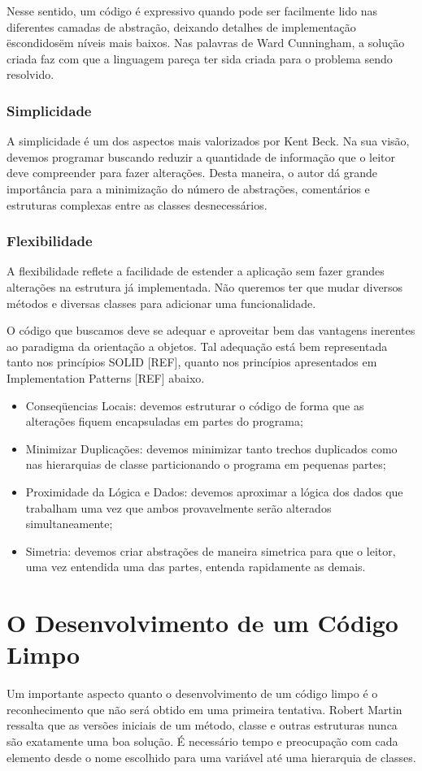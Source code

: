 Nesse sentido, um código é expressivo quando pode ser facilmente lido nas diferentes camadas de abstração, deixando detalhes de implementação \"escondidos\" em níveis mais baixos. Nas palavras de Ward Cunningham, a solução criada faz com que a linguagem pareça ter sida criada para o problema sendo resolvido.

\subsubsection{Simplicidade}
A simplicidade é um dos aspectos mais valorizados por Kent Beck. Na sua visão, devemos programar buscando reduzir a quantidade de informação que o leitor deve compreender para fazer alterações. Desta maneira, o autor dá grande importância para a minimização do número de abstrações, comentários e estruturas complexas entre as classes desnecessários.

\subsubsection{Flexibilidade}
A flexibilidade reflete a facilidade de estender a aplicação sem fazer grandes alterações na estrutura já implementada. Não queremos ter que mudar diversos métodos e diversas classes para adicionar uma funcionalidade.

O código que buscamos deve se adequar e aproveitar bem das vantagens inerentes ao paradigma da orientação a objetos. Tal adequação está bem representada tanto nos princípios SOLID [REF], quanto nos princípios apresentados em Implementation Patterns [REF] abaixo.

\begin{itemize}
	\item Conseqüencias Locais: devemos estruturar o código de forma que as alterações fiquem encapsuladas em partes do programa;
	\item Minimizar Duplicações: devemos minimizar tanto trechos duplicados como nas hierarquias de classe particionando o programa em pequenas partes;
	\item Proximidade da Lógica e Dados: devemos aproximar a lógica dos dados que trabalham uma vez que ambos provavelmente serão alterados simultaneamente;
	\item Simetria: devemos criar abstrações de maneira simetrica para que o leitor, uma vez entendida uma das partes, entenda rapidamente as demais.
\end{itemize}

\section{O Desenvolvimento de um Código Limpo} 
Um importante aspecto quanto o desenvolvimento de um código limpo é o reconhecimento que não será obtido em uma primeira tentativa. Robert Martin ressalta que as versões iniciais de um método, classe e outras estruturas nunca são exatamente uma boa solução. É necessário tempo e preocupação com cada elemento desde o nome escolhido para uma variável até uma hierarquia de classes.

